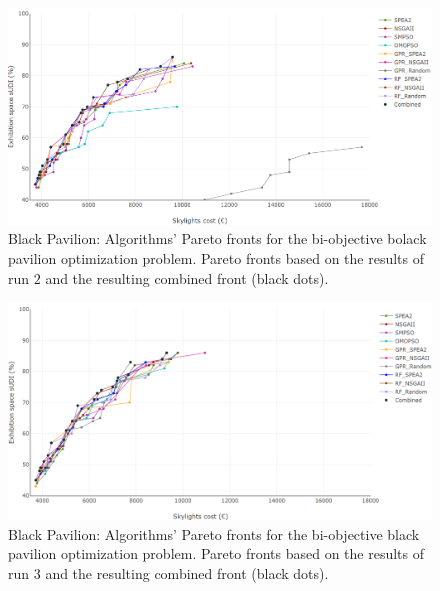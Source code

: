 \begin{figure}[h!]
	\centering
	\includegraphics[width=\textwidth]{Images/Evaluation/BlackPavilion/All_Algorithms_run2-2019-04-19.png}
	\caption[Black Pavilion: Pareto Fronts for run 2]{Black Pavilion: Algorithms' Pareto fronts for the bi-objective bolack pavilion optimization problem. Pareto fronts based on the results of run $2$ and the resulting combined front (black dots).}
	\label{table:blackpavilionrun2}
\end{figure}

\begin{figure}[h!]
	\centering
	\includegraphics[width=\textwidth]{Images/Evaluation/BlackPavilion/All_Algorithms_run3-2019-04-19_2.png}
	\caption[Black Pavilion: Pareto Fronts for run 3]{Black Pavilion: Algorithms' Pareto fronts for the bi-objective black pavilion optimization problem. Pareto fronts based on the results of run $3$ and the resulting combined front (black dots).}
	\label{table:blackpavilionrun3}
\end{figure}
